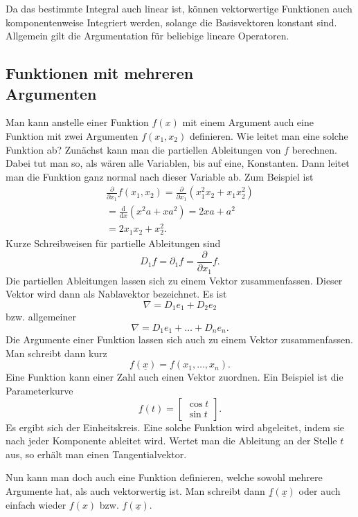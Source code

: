 \documentclass[a4paper,10pt,fleqn,twocolumn,twoside]{article}
\begin{document}
Da das bestimmte Integral auch linear ist, können vektorwertige
Funktionen auch komponentenweise Integriert werden, solange die
Basisvektoren konstant sind. Allgemein gilt die Argumentation für
beliebige lineare Operatoren.


\subsection[Funktionen mit mehreren Argumenten]
{Funktionen mit mehreren\\
Argumenten}

Man kann anstelle einer Funktion \(f(x)\) mit einem Argument auch
eine Funktion mit zwei Argumenten \(f(x_1,x_2)\) definieren. Wie
leitet man eine solche Funktion ab? Zunächst kann man die partiellen
Ableitungen von \(f\) berechnen. Dabei tut man so, als wären alle
Variablen, bis auf eine, Konstanten. Dann leitet man die Funktion ganz
normal nach dieser Variable ab. Zum Beispiel ist
\begin{gather*}
\frac{\partial}{\partial x_1}f(x_1,x_2)
= \frac{\partial}{\partial x_1} (x_1^2x_2+x_1x_2^2)\\
= \frac{\mathrm d}{\mathrm dx} (x^2a+xa^2) = 2xa+a^2\\
= 2x_1x_2+x_2^2.
\end{gather*}
\noindent
Kurze Schreibweisen für partielle Ableitungen sind
\[D_1f = \partial_1f = \frac{\partial}{\partial x_1}f.\]
\noindent
Die partiellen Ableitungen lassen sich zu einem Vektor zusammenfassen.
Dieser Vektor wird dann als Nablavektor bezeichnet. Es ist
\[\nabla = D_1e_1+D_2e_2\]
\noindent
bzw. allgemeiner
\[\nabla = D_1e_1+\dots+D_ne_n.\]
\noindent
Die Argumente einer Funktion lassen sich auch zu einem Vektor
zusammenfassen. Man schreibt dann kurz
\[f(\underline x) = f(x_1,\dots,x_n).\]
\noindent
Eine Funktion kann einer Zahl auch einen Vektor zuordnen.
Ein Beispiel ist die Parameterkurve
\[\underline f(t) = \begin{bmatrix}\cos t\\ \sin t\end{bmatrix}.\]
\noindent
Es ergibt sich der Einheitskreis. Eine solche Funktion wird
abgeleitet, indem sie nach jeder Komponente ableitet wird.
Wertet man die Ableitung an der Stelle \(t\) aus, so erhält man
einen Tangentialvektor.

Nun kann man doch auch eine Funktion definieren, welche sowohl
mehrere Argumente hat, als auch vektorwertig ist. Man schreibt dann
\(\underline f(\underline x)\) oder auch einfach wieder
\(f(x)\) bzw. \(f(\underline x)\).
\end{document}
